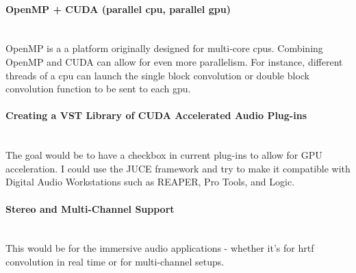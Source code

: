 \paragraph{OpenMP + CUDA (parallel \gls{cpu}, parallel \gls{gpu})} \hspace{0pt} \\
\indent OpenMP is a a platform originally designed for multi-core \glspl{cpu}. Combining OpenMP and CUDA can allow for even more parallelism. For instance, different threads of a \gls{cpu} can launch the single block convolution or double block convolution function to be sent to each \gls{gpu}. 

\paragraph{Creating a VST Library of CUDA Accelerated Audio Plug-ins} \hspace{0pt} \\
\indent The goal would be to have a checkbox in current plug-ins to allow for GPU acceleration. I could use the JUCE framework and try to make it compatible with Digital Audio Workstations such as REAPER, Pro Tools, and Logic.

\paragraph{Stereo and Multi-Channel Support} \hspace{0pt} \\
\indent This would be for the immersive audio applications - whether it's for \gls{hrtf} convolution in real time or for multi-channel setups.

\newpage
\raggedright
{}



\newpage

\printglossary

\newpage



